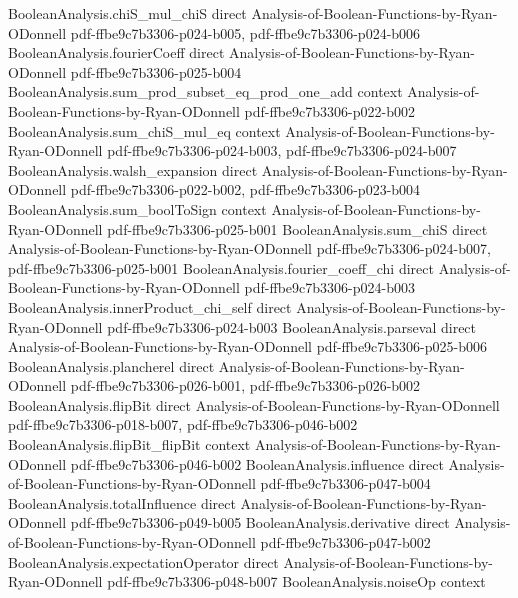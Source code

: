 \begin{lemma}
\proofstep
  {BooleanAnalysis.chiS_mul_chiS}
  {direct}
  {Analysis-of-Boolean-Functions-by-Ryan-ODonnell}
  {pdf-ffbe9c7b3306-p024-b005,
    pdf-ffbe9c7b3306-p024-b006}
\proofstep
  {BooleanAnalysis.fourierCoeff}
  {direct}
  {Analysis-of-Boolean-Functions-by-Ryan-ODonnell}
  {pdf-ffbe9c7b3306-p025-b004}
\proofstep
  {BooleanAnalysis.sum_prod_subset_eq_prod_one_add}
  {context}
  {Analysis-of-Boolean-Functions-by-Ryan-ODonnell}
  {pdf-ffbe9c7b3306-p022-b002}
\proofstep
  {BooleanAnalysis.sum_chiS_mul_eq}
  {context}
  {Analysis-of-Boolean-Functions-by-Ryan-ODonnell}
  {pdf-ffbe9c7b3306-p024-b003,
    pdf-ffbe9c7b3306-p024-b007}
\proofstep
  {BooleanAnalysis.walsh_expansion}
  {direct}
  {Analysis-of-Boolean-Functions-by-Ryan-ODonnell}
  {pdf-ffbe9c7b3306-p022-b002,
    pdf-ffbe9c7b3306-p023-b004}
\proofstep
  {BooleanAnalysis.sum_boolToSign}
  {context}
  {Analysis-of-Boolean-Functions-by-Ryan-ODonnell}
  {pdf-ffbe9c7b3306-p025-b001}
\proofstep
  {BooleanAnalysis.sum_chiS}
  {direct}
  {Analysis-of-Boolean-Functions-by-Ryan-ODonnell}
  {pdf-ffbe9c7b3306-p024-b007,
    pdf-ffbe9c7b3306-p025-b001}
\proofstep
  {BooleanAnalysis.fourier_coeff_chi}
  {direct}
  {Analysis-of-Boolean-Functions-by-Ryan-ODonnell}
  {pdf-ffbe9c7b3306-p024-b003}
\proofstep
  {BooleanAnalysis.innerProduct_chi_self}
  {direct}
  {Analysis-of-Boolean-Functions-by-Ryan-ODonnell}
  {pdf-ffbe9c7b3306-p024-b003}
\proofstep
  {BooleanAnalysis.parseval}
  {direct}
  {Analysis-of-Boolean-Functions-by-Ryan-ODonnell}
  {pdf-ffbe9c7b3306-p025-b006}
\proofstep
  {BooleanAnalysis.plancherel}
  {direct}
  {Analysis-of-Boolean-Functions-by-Ryan-ODonnell}
  {pdf-ffbe9c7b3306-p026-b001,
    pdf-ffbe9c7b3306-p026-b002}
\proofstep
  {BooleanAnalysis.flipBit}
  {direct}
  {Analysis-of-Boolean-Functions-by-Ryan-ODonnell}
  {pdf-ffbe9c7b3306-p018-b007,
    pdf-ffbe9c7b3306-p046-b002}
\proofstep
  {BooleanAnalysis.flipBit_flipBit}
  {context}
  {Analysis-of-Boolean-Functions-by-Ryan-ODonnell}
  {pdf-ffbe9c7b3306-p046-b002}
\proofstep
  {BooleanAnalysis.influence}
  {direct}
  {Analysis-of-Boolean-Functions-by-Ryan-ODonnell}
  {pdf-ffbe9c7b3306-p047-b004}
\proofstep
  {BooleanAnalysis.totalInfluence}
  {direct}
  {Analysis-of-Boolean-Functions-by-Ryan-ODonnell}
  {pdf-ffbe9c7b3306-p049-b005}
\proofstep
  {BooleanAnalysis.derivative}
  {direct}
  {Analysis-of-Boolean-Functions-by-Ryan-ODonnell}
  {pdf-ffbe9c7b3306-p047-b002}
\proofstep
  {BooleanAnalysis.expectationOperator}
  {direct}
  {Analysis-of-Boolean-Functions-by-Ryan-ODonnell}
  {pdf-ffbe9c7b3306-p048-b007}
\proofstep
  {BooleanAnalysis.noiseOp}
  {context}

\end{lemma}
